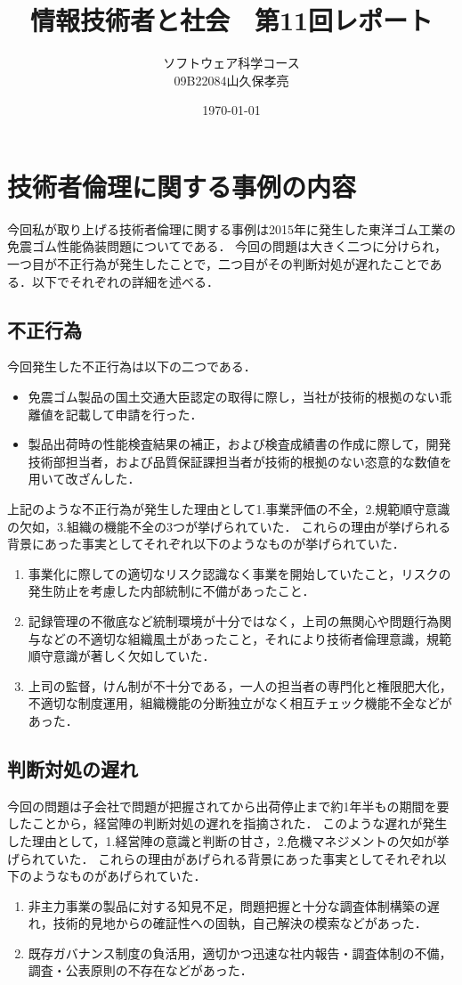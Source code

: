 \documentclass[dvipdfmx]{jarticle}
\title{情報技術者と社会　第11回レポート}
\author{ソフトウェア科学コース\\09B22084山久保孝亮}
\date{\today}
\begin{document}
\maketitle
\section{技術者倫理に関する事例の内容}
今回私が取り上げる技術者倫理に関する事例は2015年に発生した東洋ゴム工業の免震ゴム性能偽装問題についてである．
今回の問題は大きく二つに分けられ，一つ目が不正行為が発生したことで，二つ目がその判断対処が遅れたことである．\cite{0}以下でそれぞれの詳細を述べる．
\subsection{不正行為}
今回発生した不正行為は以下の二つである．\cite{1}
\begin{itemize}
  \item 免震ゴム製品の国土交通大臣認定の取得に際し，当社が技術的根拠のない乖離値を記載して申請を行った．
  \item 製品出荷時の性能検査結果の補正，および検査成績書の作成に際して，開発技術部担当者，および品質保証課担当者が技術的根拠のない恣意的な数値を用いて改ざんした．
\end{itemize}
上記のような不正行為が発生した理由として1.事業評価の不全，2.規範順守意識の欠如，3.組織の機能不全の3つが挙げられていた．\cite{0}
これらの理由が挙げられる背景にあった事実としてそれぞれ以下のようなものが挙げられていた．
\begin{enumerate}
  \item 事業化に際しての適切なリスク認識なく事業を開始していたこと，リスクの発生防止を考慮した内部統制に不備があったこと．
  \item 記録管理の不徹底など統制環境が十分ではなく，上司の無関心や問題行為関与などの不適切な組織風土があったこと，それにより技術者倫理意識，規範順守意識が著しく欠如していた．
  \item 上司の監督，けん制が不十分である，一人の担当者の専門化と権限肥大化，不適切な制度運用，組織機能の分断独立がなく相互チェック機能不全などがあった．
\end{enumerate}
\subsection{判断対処の遅れ}
今回の問題は子会社で問題が把握されてから出荷停止まで約1年半もの期間を要したことから，\cite{2}経営陣の判断対処の遅れを指摘された．
このような遅れが発生した理由として，1.経営陣の意識と判断の甘さ，2.危機マネジメントの欠如が挙げられていた．
これらの理由があげられる背景にあった事実としてそれぞれ以下のようなものがあげられていた．
\begin{enumerate}
  \item 非主力事業の製品に対する知見不足，問題把握と十分な調査体制構築の遅れ，技術的見地からの確証性への固執，自己解決の模索などがあった．
  \item 既存ガバナンス制度の負活用，適切かつ迅速な社内報告・調査体制の不備，調査・公表原則の不存在などがあった．
\end{enumerate}
\end{document}
